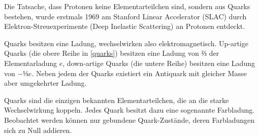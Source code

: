 Die Tatsache, dass Protonen keine Elementarteilchen sind, sondern aus Quarks bestehen, wurde erstmals 1969 am Stanford Linear Accelerator (SLAC) durch Elektron-Streuexperimente (Deep Inelastic Scattering) an Protonen entdeckt.\cite{slac-quarks}

Quarks besitzen eine Ladung, wechselwirken also elektromagnetisch.
Up-artige Quarks (die obere Reihe in \eqref{quarks}) besitzen eine Ladung von $⅔$ der Elementarladung $e$, down-artige Quarks (die untere Reihe) besitzen eine Ladung von $-⅓e$.
Neben jedem der Quarks existiert ein Antiquark mit gleicher Masse aber umgekehrter Ladung.

Quarks sind die einzigen bekannten Elementarteilchen, die an die starke Wechselwirkung koppeln.
Jedes Quark besitzt dazu eine sogenannte Farbladung.
Beobachtet werden können nur gebundene Quark-Zustände, deren Farbladungen sich zu Null addieren.


